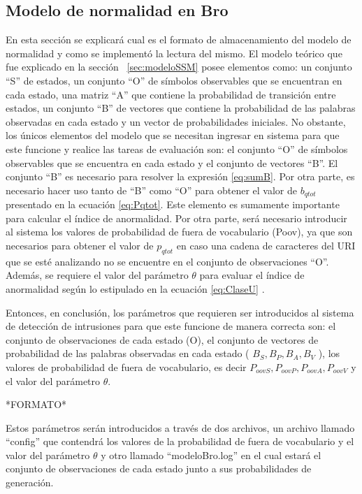 \subsection{Modelo de normalidad en Bro}
\label{sec:lecturaModelo}
En esta sección se explicará cual es el formato de almacenamiento del modelo de normalidad y como se implementó la lectura del mismo. El modelo teórico que fue explicado en la sección ~\ref{sec:modeloSSM} posee elementos como: un conjunto “S” de estados, un conjunto “O” de símbolos observables que se encuentran en cada estado, una matriz “A” que contiene la probabilidad de transición entre estados, un conjunto “B” de vectores que contiene la probabilidad de las palabras observadas en cada estado y un vector de probabilidades iniciales. No obstante, los únicos elementos del modelo que se necesitan ingresar en sistema para que este funcione y realice las tareas de evaluación son: el conjunto “O” de símbolos observables que se encuentra en cada estado y el conjunto de vectores “B”. El conjunto “B” es necesario para resolver la expresión \ref{eq:sumB}. Por otra parte, es necesario hacer uso tanto de “B” como “O” para obtener el valor de $b_{qtot}$ presentado en la ecuación \ref{eq:Pqtot}. Este elemento es sumamente importante para calcular el índice de anormalidad. Por otra parte, será necesario introducir al sistema los valores de probabilidad de fuera de vocabulario (Poov), ya que son necesarios para obtener el valor de $p_{qtot}$ en caso una cadena de caracteres del URI que se esté analizando no se encuentre en el conjunto de observaciones “O”. Además, se requiere el valor del parámetro $\theta$ para evaluar el índice de anormalidad según lo estipulado en la ecuación \ref{eq:ClaseU} .

    Entonces, en conclusión, los parámetros que requieren ser introducidos al sistema de detección de intrusiones para que este funcione de manera correcta son: el conjunto de observaciones de cada estado (O), el conjunto de vectores de probabilidad de las palabras observadas en cada estado ( $B_{S}, B_{P}, B_{A}, B_{V}$ ), los valores de probabilidad de fuera de vocabulario, es decir $P_{oovS}, P_{oovP}, P_{oovA}, P_{oovV}$ y el valor del parámetro $\theta$.

    *FORMATO*

Estos parámetros serán introducidos a través de dos archivos, un archivo llamado “config” que contendrá los valores de la probabilidad de fuera de vocabulario y el valor del parámetro $\theta$ y otro llamado “modeloBro.log” en el cual estará el conjunto de observaciones de cada estado junto a sus probabilidades de generación.

